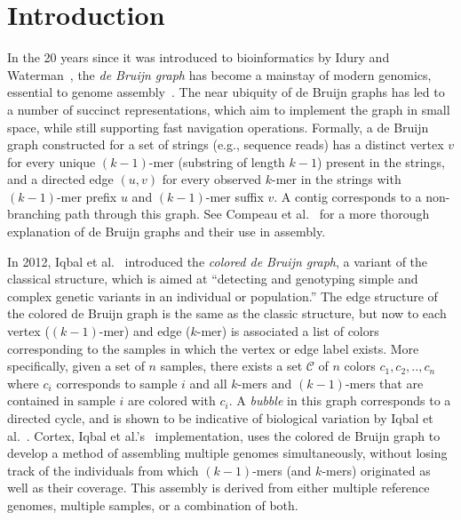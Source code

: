 
\section{Introduction}\label{sec:introduction}

In the 20 years since it was introduced to bioinformatics by Idury and Waterman~\cite{IW95}, the {\em de Bruijn graph} has become a mainstay of modern genomics, essential to genome assembly~\cite{how,sequel,ismb2015}. The near ubiquity of de Bruijn graphs has led to a number of succinct representations, which aim to implement the graph in small space, while still supporting fast navigation operations.  Formally, a de Bruijn graph constructed for a set of strings (e.g., sequence reads) has a distinct vertex $v$ for every unique $(k - 1)$-mer (substring of length $k - 1$) present in the strings, and a directed edge $(u, v)$ for every observed $k$-mer in the strings with $(k - 1)$-mer prefix $u$ and $(k - 1)$-mer suffix $v$. A contig corresponds to a non-branching path through this graph. See Compeau et al.~\cite{how} for a more thorough explanation of de Bruijn graphs and their use in assembly. 

In 2012, Iqbal et al.~\cite{ICTFM12} introduced the {\em colored de Bruijn graph}, a variant of the classical structure, which is aimed at ``detecting and genotyping simple and complex genetic variants in an individual or population.'' The edge structure of the colored de Bruijn graph is the same as the classic structure, but now to each vertex ($(k - 1)$-mer) and edge ($k$-mer) is associated a list of colors corresponding to the samples in which the vertex or edge label exists. More specifically, given a set of $n$ samples, there exists a set $\mathcal{C}$ of $n$ colors $c_1, c_2, .., c_n$ where $c_i$ corresponds to sample $i$ and all $k$-mers and $(k-1)$-mers that are contained in sample $i$ are colored with $c_i$. A {\em bubble} in this graph corresponds to a directed cycle, and is shown to be indicative of biological variation by Iqbal et al.~\cite{ICTFM12}. 
{\sc Cortex}, Iqbal et al.'s~\cite{ICTFM12} implementation, uses the colored de Bruijn graph to develop a method of assembling multiple genomes simultaneously, without losing track of the individuals from which $(k - 1)$-mers (and $k$-mers) originated as well as their coverage. This assembly is derived from either multiple reference genomes, multiple samples, or a combination of both.

